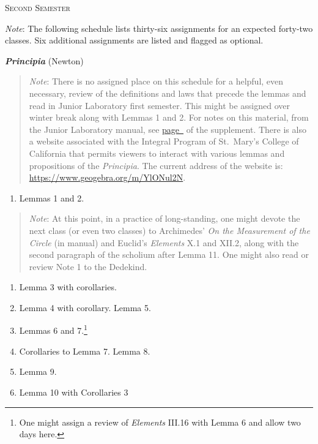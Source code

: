 \documentclass[10pt]{article}
\begin{document}
{%

\newpage
\begin{center}
	\textsc{\small{Second Semester}}
\end{center}
{\small \emph{Note}: The following schedule lists 
	thirty-six assignments for an expected forty-two
	classes. Six additional
	assignments are listed and flagged as optional.}

\textbf{\emph{Principia}} (Newton)
\label{NewtonStart}
\begin{quote}
{\small\emph{Note}: There is no assigned place on this
	schedule for a helpful, even necessary, review of
	the definitions and laws that precede the lemmas and
	read in Junior Laboratory first semester. This might
	be assigned over winter break along with Lemmas 1
	and 2. For notes on this material, from the Junior
	Laboratory manual, see
	\hyperref[supple.64]{page~\pageref{supple.64}} of
	the supplement. There is also a website associated
	with the Integral Program of St.\ Mary's College of
	California that permits viewers to interact with
	various lemmas and propositions of the \emph{Principia}.
	The current address of the website is: \href{https://www.geogebra.org/m/YlONul2N}{https://www.geogebra.org/m/YlONul2N}.}
\end{quote}
\begin{enumerate}[noitemsep] \item
		Lemmas 1 and 2.  \end{enumerate}
\begin{quote} \small{\emph{Note}: At this point, in a
		practice of long-standing, one might devote
		the next class (or even two classes) to
		Archimedes' \emph{On the Measurement of the
			Circle} (in manual) and Euclid's
		\emph{Elements} X.1 and XII.2, along with
		the second paragraph of the scholium after
		Lemma 11. One might also read or review Note
		1 to the Dedekind.  \label{Dedekind}}
\end{quote}
\begin{enumerate}[resume*] \item Lemma 3 with
		corollaries.  \item Lemma 4 with corollary.
		Lemma 5.  \item Lemmas 6 and 7.\footnote{One
			might assign a review of
			\emph{Elements} III.16 with Lemma 6
			and allow two days here.} \item
		Corollaries to Lemma 7. Lemma 8.  \item
		Lemma 9.  \item Lemma 10 with Corollaries 3

\end{enumerate}}
\end{document}
